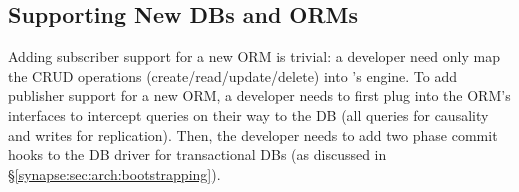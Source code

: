 \setlength{\tabcolsep}{3pt}
\begin{table}[t]
 \vspace{-0.3cm}
 \caption{{\small {\bf Support for Various DBs.}
 Shows ORM- and DB-specific lines of code (LoC) to support varied DBs.
 For ORMs supporting many DBs (e.g., ActiveRecord), adding a new DB comes for free.}}
 \label{synapse:tab:db-heterogeneity}
\end{table}
\setlength{\tabcolsep}{5pt}

\subsection{Supporting New DBs and ORMs}
Adding subscriber support for a new ORM is trivial: a developer need only map the CRUD operations (create/read/update/delete) into \synapse's engine.
To add publisher support for a new ORM, a developer needs to first plug into the ORM's interfaces to intercept queries on their way to the DB (all queries for causality and writes for replication).
Then, the developer needs to add two phase commit hooks to the DB driver for transactional DBs (as discussed in \S\ref{synapse:sec:arch:bootstrapping}).

